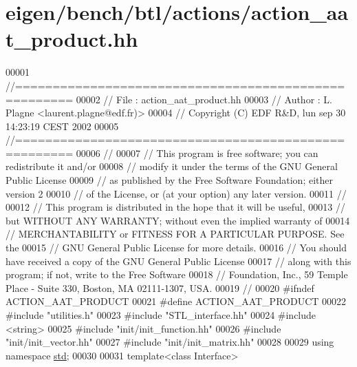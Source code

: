 \hypertarget{eigen_2bench_2btl_2actions_2action__aat__product_8hh_source}{}\section{eigen/bench/btl/actions/action\+\_\+aat\+\_\+product.hh}
\label{eigen_2bench_2btl_2actions_2action__aat__product_8hh_source}

\begin{DoxyCode}
00001 \textcolor{comment}{//=====================================================}
00002 \textcolor{comment}{// File   :  action\_aat\_product.hh}
00003 \textcolor{comment}{// Author :  L. Plagne <laurent.plagne@edf.fr)>}
00004 \textcolor{comment}{// Copyright (C) EDF R&D,  lun sep 30 14:23:19 CEST 2002}
00005 \textcolor{comment}{//=====================================================}
00006 \textcolor{comment}{//}
00007 \textcolor{comment}{// This program is free software; you can redistribute it and/or}
00008 \textcolor{comment}{// modify it under the terms of the GNU General Public License}
00009 \textcolor{comment}{// as published by the Free Software Foundation; either version 2}
00010 \textcolor{comment}{// of the License, or (at your option) any later version.}
00011 \textcolor{comment}{//}
00012 \textcolor{comment}{// This program is distributed in the hope that it will be useful,}
00013 \textcolor{comment}{// but WITHOUT ANY WARRANTY; without even the implied warranty of}
00014 \textcolor{comment}{// MERCHANTABILITY or FITNESS FOR A PARTICULAR PURPOSE.  See the}
00015 \textcolor{comment}{// GNU General Public License for more details.}
00016 \textcolor{comment}{// You should have received a copy of the GNU General Public License}
00017 \textcolor{comment}{// along with this program; if not, write to the Free Software}
00018 \textcolor{comment}{// Foundation, Inc., 59 Temple Place - Suite 330, Boston, MA  02111-1307, USA.}
00019 \textcolor{comment}{//}
00020 \textcolor{preprocessor}{#ifndef ACTION\_AAT\_PRODUCT}
00021 \textcolor{preprocessor}{#define ACTION\_AAT\_PRODUCT}
00022 \textcolor{preprocessor}{#include "utilities.h"}
00023 \textcolor{preprocessor}{#include "STL\_interface.hh"}
00024 \textcolor{preprocessor}{#include <string>}
00025 \textcolor{preprocessor}{#include "init/init\_function.hh"}
00026 \textcolor{preprocessor}{#include "init/init\_vector.hh"}
00027 \textcolor{preprocessor}{#include "init/init\_matrix.hh"}
00028 
00029 \textcolor{keyword}{using namespace }\hyperlink{namespacestd}{std};
00030 
00031 \textcolor{keyword}{template}<\textcolor{keyword}{class} Interface>

\end{DoxyCode}
